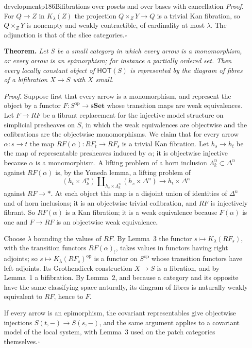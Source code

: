 \begin{dcomment}{development}{p186}{Bifibrations over posets and over bases with cancellation}
\textit{Proof.}
For $Q\to Z$ in $K_\lambda(Z)$ the projection $Q\times_ZY\to Q$ is a trivial Kan fibration, so $Q\times_ZY$ is nonempty and weakly contractible, of cardinality at most $\lambda$. The adjunction is that of the slice categories.\hfill$\square$

\textbf{Theorem.}\ours
\textit{Let $S$ be a small category in which every arrow is a monomorphism, or every arrow is an epimorphism; for instance a partially ordered set. Then every locally constant object of $\mathsf{HOT}(S)$ is represented by the diagram of fibres of a bifibration $X\to S$ with $X$ small.}

\textit{Proof.}
Suppose first that every arrow is a monomorphism, and represent the object by a functor $F:S^{\mathrm{op}}\to\mathbf{sSet}$ whose transition maps are weak equivalences. Let $F\to RF$ be a fibrant replacement for the injective model structure on simplicial presheaves on $S$, in which the weak equivalences are objectwise and the cofibrations are the objectwise monomorphisms. We claim that for every arrow $\alpha:s\to t$ the map $RF(\alpha):RF_t\to RF_s$ is a trivial Kan fibration. Let $h_s\to h_t$ be the map of representable presheaves induced by $\alpha$; it is objectwise injective because $\alpha$ is a monomorphism. A lifting problem of a horn inclusion $\Lambda^n_k\subset\Delta^n$ against $RF(\alpha)$ is, by the Yoneda lemma, a lifting problem of
\[
 (h_t\times\Lambda^n_k)\amalg_{h_s\times\Lambda^n_k}(h_s\times\Delta^n)\longrightarrow h_t\times\Delta^n
\]
against $RF\to*$. At each object this map is a disjoint union of identities of $\Delta^n$ and of horn inclusions; it is an objectwise trivial cofibration, and $RF$ is injectively fibrant. So $RF(\alpha)$ is a Kan fibration; it is a weak equivalence because $F(\alpha)$ is one and $F\to RF$ is an objectwise weak equivalence.

Choose $\lambda$ bounding the values of $RF$. By Lemma~3 the functor $s\mapsto K_\lambda(RF_s)$, with the transition functors $RF(\alpha)_!$, takes values in functors having right adjoints; so $s\mapsto K_\lambda(RF_s)^{\mathrm{op}}$ is a functor on $S^{\mathrm{op}}$ whose transition functors have left adjoints. Its Grothendieck construction $X\to S$ is a fibration, and by Lemma~1 a bifibration. By Lemma~2, and because a category and its opposite have the same classifying space naturally, its diagram of fibres is naturally weakly equivalent to $RF$, hence to $F$.

If every arrow is an epimorphism, the covariant representables give objectwise injections $S(t,-)\to S(s,-)$, and the same argument applies to a covariant model of the local system, with Lemma~3 used on the patch categories themselves.\hfill$\square$


\end{dcomment}
